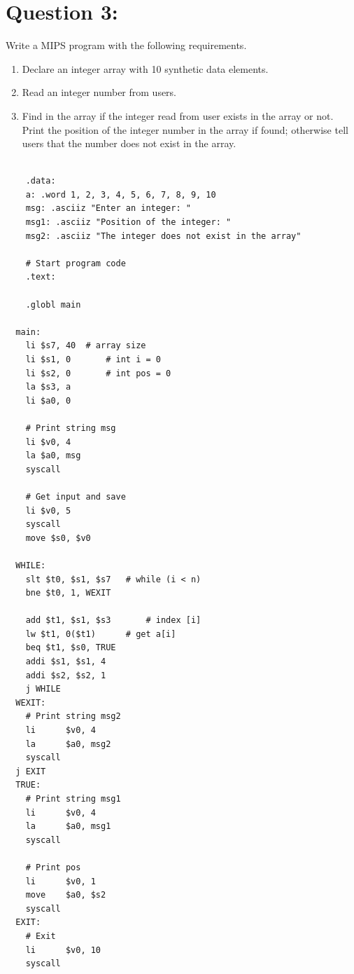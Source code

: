 \documentclass[12pt,a4paper]{article}
\begin{document}
\section*{Question 3:}
Write a MIPS program with the following requirements.
\begin{enumerate}
  \item Declare an integer array with 10 synthetic data elements.
  \item Read an integer number from users.
  \item Find in the array if the integer read from user exists in the array or not. Print the position of the integer number in the array if found; otherwise tell users that the number does not exist in the array.
\end{enumerate}

\begin{mdframed}[hidealllines=true,backgroundcolor=magenta!10]
  \begin{lstlisting}

    .data:
    a: .word 1, 2, 3, 4, 5, 6, 7, 8, 9, 10
    msg: .asciiz "Enter an integer: "
    msg1: .asciiz "Position of the integer: "
    msg2: .asciiz "The integer does not exist in the array"

    # Start program code
    .text:

    .globl main

  main:
    li $s7, 40 	# array size
    li $s1, 0		# int i = 0
    li $s2, 0		# int pos = 0
    la $s3, a
    li $a0, 0

    # Print string msg
    li $v0, 4
    la $a0, msg
    syscall

    # Get input and save
    li $v0, 5
    syscall
    move $s0, $v0

  WHILE:
    slt $t0, $s1, $s7	# while (i < n)
    bne $t0, 1, WEXIT

    add $t1, $s1, $s3		# index [i]
    lw $t1, 0($t1)		# get a[i]
    beq $t1, $s0, TRUE
    addi $s1, $s1, 4
    addi $s2, $s2, 1
    j WHILE
  WEXIT:
    # Print string msg2
    li      $v0, 4
    la      $a0, msg2
    syscall
  j EXIT
  TRUE:
    # Print string msg1
    li      $v0, 4
    la      $a0, msg1
    syscall

    # Print pos
    li      $v0, 1
    move    $a0, $s2
    syscall
  EXIT:
    # Exit
    li      $v0, 10
    syscall

    \end{lstlisting}
\end{mdframed}
\end{document}
